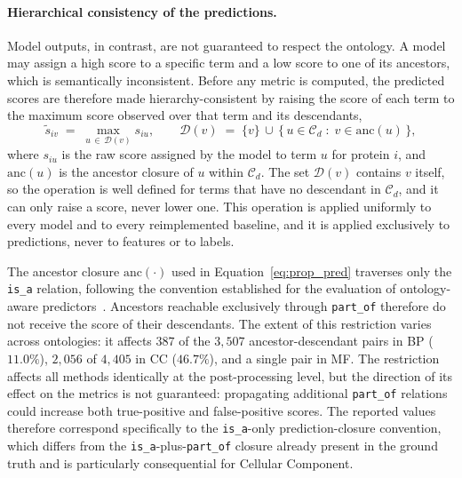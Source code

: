 \documentclass[Ingles]{ic-tese-v3}
\begin{document}
\paragraph{Hierarchical consistency of the predictions.}
Model outputs, in contrast, are not guaranteed to respect the ontology. A model
may assign a high score to a specific term and a low score to one of its
ancestors, which is semantically inconsistent. Before any metric is computed, the
predicted scores are therefore made hierarchy-consistent by raising the score of
each term to the maximum score observed over that term and its descendants,
\begin{equation}
\label{eq:prop_pred}
\tilde{s}_{iv} \;=\; \max_{u \,\in\, \mathcal{D}(v)} s_{iu},
\qquad
\mathcal{D}(v) \;=\; \{v\} \,\cup\,
\bigl\{\, u \in \mathcal{C}_d \;:\; v \in \mathrm{anc}(u) \,\bigr\},
\end{equation}
\noindent where $s_{iu}$ is the raw score assigned by the model to term $u$ for protein
$i$, and $\mathrm{anc}(u)$ is the ancestor closure of $u$ within $\mathcal{C}_d$.
The set $\mathcal{D}(v)$ contains $v$ itself, so the operation is well defined
for terms that have no descendant in $\mathcal{C}_d$, and it can only raise a
score, never lower one. This operation is applied uniformly to every model and to
every reimplemented baseline, and it is applied exclusively to predictions, never
to features or to labels.

The ancestor closure $\mathrm{anc}(\cdot)$ used in Equation~\ref{eq:prop_pred}
traverses only the \texttt{is\_a} relation, following the convention established
for the evaluation of ontology-aware predictors~\cite{kulmanov2018deepgo}.
Ancestors reachable exclusively through \texttt{part\_of} therefore do not
receive the score of their descendants. The extent of this restriction varies
across ontologies: it affects $387$ of the $3{,}507$ ancestor-descendant pairs in
BP ($11.0\%$), $2{,}056$ of $4{,}405$ in CC ($46.7\%$), and a single pair in MF.
The restriction affects all methods identically at the post-processing level, but the direction of its effect on the metrics is not guaranteed: propagating additional \texttt{part\_of} relations could increase both true-positive and false-positive scores. The reported values therefore correspond specifically to the \texttt{is\_a}-only prediction-closure convention, which differs from the \texttt{is\_a}-plus-\texttt{part\_of} closure already present in the ground truth and is particularly consequential for Cellular Component.
\end{document}
